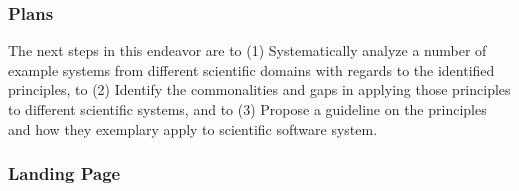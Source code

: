 \subsubsection{Plans}
The next steps in this endeavor are to (1) Systematically analyze a number of example systems from different scientific domains with regards to the identified principles, to (2) Identify the commonalities and gaps in applying those principles to different scientific systems, and to (3) Propose a guideline on the principles and how they exemplary apply to scientific software system.

\subsubsection{Landing Page}
